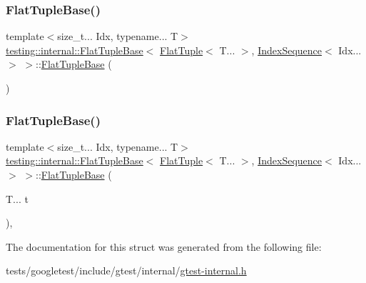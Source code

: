 \subsubsection{\texorpdfstring{Flat\+Tuple\+Base()}{FlatTupleBase()}\hspace{0.1cm}{\footnotesize\ttfamily [1/2]}}
{\footnotesize\ttfamily template$<$size\+\_\+t... Idx, typename... T$>$ \\
\hyperlink{structtesting_1_1internal_1_1FlatTupleBase}{testing\+::internal\+::\+Flat\+Tuple\+Base}$<$ \hyperlink{classtesting_1_1internal_1_1FlatTuple}{Flat\+Tuple}$<$ T... $>$, \hyperlink{structtesting_1_1internal_1_1IndexSequence}{Index\+Sequence}$<$ Idx... $>$ $>$\+::\hyperlink{structtesting_1_1internal_1_1FlatTupleBase}{Flat\+Tuple\+Base} (\begin{DoxyParamCaption}{ }\end{DoxyParamCaption})\hspace{0.3cm}{\ttfamily [default]}}

\mbox{\label{structtesting_1_1internal_1_1FlatTupleBase_3_01FlatTuple_3_01T_8_8_8_01_4_00_01IndexSequence_3_01Idx_8_8_8_01_4_01_4_ac515eec5c0647748bf8fa4ff553c706e}} 
\subsubsection{\texorpdfstring{Flat\+Tuple\+Base()}{FlatTupleBase()}\hspace{0.1cm}{\footnotesize\ttfamily [2/2]}}
{\footnotesize\ttfamily template$<$size\+\_\+t... Idx, typename... T$>$ \\
\hyperlink{structtesting_1_1internal_1_1FlatTupleBase}{testing\+::internal\+::\+Flat\+Tuple\+Base}$<$ \hyperlink{classtesting_1_1internal_1_1FlatTuple}{Flat\+Tuple}$<$ T... $>$, \hyperlink{structtesting_1_1internal_1_1IndexSequence}{Index\+Sequence}$<$ Idx... $>$ $>$\+::\hyperlink{structtesting_1_1internal_1_1FlatTupleBase}{Flat\+Tuple\+Base} (\begin{DoxyParamCaption}\item[{T...}]{t }\end{DoxyParamCaption})\hspace{0.3cm}{\ttfamily [inline]}, {\ttfamily [explicit]}}



The documentation for this struct was generated from the following file\+:\begin{DoxyCompactItemize}
\item 
tests/googletest/include/gtest/internal/\hyperlink{gtest-internal_8h}{gtest-\/internal.\+h}\end{DoxyCompactItemize}
